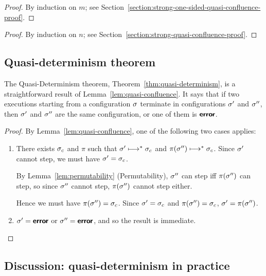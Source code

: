 \LemStrongOneSidedQuasiConfluence
\begin{proof}
  By induction on $m$; see
  Section~\ref{section:strong-one-sided-quasi-confluence-proof}.
\end{proof}

\LemStrongQuasiConfluence
\begin{proof}
  By induction on $n$; see
  Section~\ref{section:strong-quasi-confluence-proof}.
\end{proof}

\LemQuasiConfluence
 
\subsection{Quasi-determinism theorem}\label{subsection:quasi-quasi-determinism}

The Quasi-Determinism theorem, Theorem~\ref{thm:quasi-determinism}, is
a straightforward result of Lemma~\ref{lem:quasi-confluence}.  It says
that if two executions starting from a configuration $\sigma$ terminate
in configurations $\sigma'$ and $\sigma''$, then $\sigma'$ and $\sigma''$
are the same configuration, or one of them is $\textbf{\textsf{error}}$.

\ThmQuasiDeterminism
\begin{proof}
  By Lemma~\ref{lem:quasi-confluence}, one of the following two cases
  applies:
  \begin{enumerate}
    \item There exists $\sigma_c$ and $\pi$ such that $\sigma'
      \longmapsto^* \sigma_c$ and $\pi(\sigma'') \longmapsto^* \sigma_c$.
      Since $\sigma'$ cannot step, we must have $\sigma' = \sigma_c$.

      By Lemma~\ref{lem:permutability} (Permutability), $\sigma''$ can
      step iff $\pi(\sigma'')$ can step, so since $\sigma''$ cannot
      step, $\pi(\sigma'')$ cannot step either.

      Hence we must have $\pi(\sigma'') = \sigma_c$.  Since $\sigma' =
      \sigma_c$ and $\pi(\sigma'') = \sigma_c$, $\sigma' = \pi(\sigma'')$.
    \item $\sigma' = \textbf{\textsf{error}}$ or $\sigma'' = \textbf{\textsf{error}}$, and so the result
      is immediate.
  \end{enumerate}
\end{proof}

\subsection{Discussion: quasi-determinism in practice}

